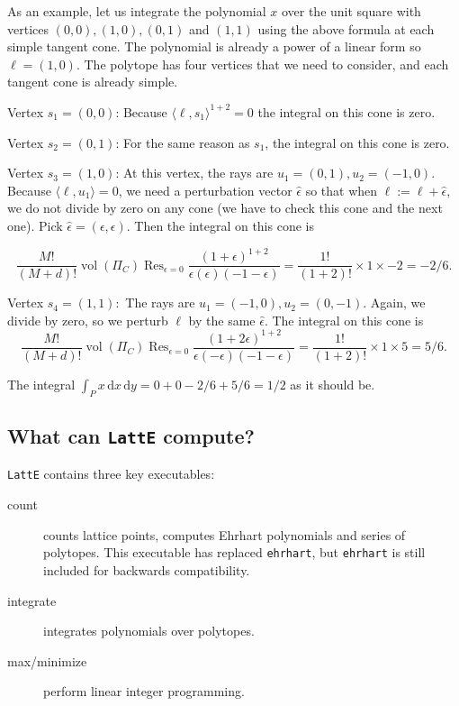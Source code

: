 \documentclass{article}
\newcommand{\latte}{{\tt LattE}\xspace}
\DeclareMathOperator{\vol}{vol}     %
\DeclareMathOperator{\Res}{Res}  %
\renewcommand\d{\,\mathrm{d}}
\begin{document}
	


As an example, let us integrate the polynomial $x$ over the unit square with vertices $(0,0), (1,0), (0,1)$ and $(1,1)$ using the above formula at each simple tangent cone. The polynomial is already a power of a linear form so $\ell = (1,0)$. The polytope has four vertices that we need to consider, and each tangent cone is already simple.



Vertex $s_1 = (0,0)$: Because $\langle \ell, s_1 \rangle ^{1+2} = 0$ the integral on this cone is zero.

Vertex $s_2 = (0,1)$: For the same reason as $s_1$, the integral on this cone is zero.

Vertex $s_3 = (1,0)$: At this vertex, the rays are $u_1 = (0,1), u_2=(-1,0)$. Because $\langle \ell, u_1 \rangle = 0$, we need a perturbation vector $\hat \epsilon$ so that when $\ell := \ell + \hat \epsilon$, we do not divide by zero on any cone (we have to check this cone and the next one). Pick $\hat \epsilon = (\epsilon, \epsilon)$. Then the integral on this cone is
	
\begin{displaymath}
 \frac{M!}{(M+d)!} \vol(\Pi_C) \Res_{\epsilon=0}\frac{(1 + \epsilon)^{1+2}}{\epsilon (\epsilon) (-1 - \epsilon)} = \frac{1!}{(1+2)!} \times 1 \times -2 = -2/6.
\end{displaymath}

Vertex $s_4 = (1,1):$ The rays are $u_1 = (-1,0), u_2= (0,-1)$. Again, we divide by zero, so we perturb $\ell$ by the same $\hat \epsilon$. The integral on this cone  is
\begin{displaymath}
 \frac{M!}{(M+d)!} \vol(\Pi_C) \Res_{\epsilon=0}\frac{(1 + 2\epsilon)^{1+2}}{\epsilon (-\epsilon) (-1 - \epsilon)} = \frac{1!}{(1+2)!} \times 1 \times 5 = 5/6.
\end{displaymath}

The integral $\int_P x  \d{x}\d{y} = 0 + 0 -2/6 + 5/6 = 1/2$ as it should be.




\subsection{What can {\tt LattE} compute?}

\latte contains three key executables:
\begin{description}
	\item[count] counts lattice points, computes Ehrhart polynomials and series of polytopes. This executable has replaced {\tt ehrhart}, but {\tt ehrhart} is still included for backwards compatibility.
	\item[integrate] integrates polynomials over polytopes.
	\item[max/minimize] perform linear integer programming.
\end{description}
\end{document}

